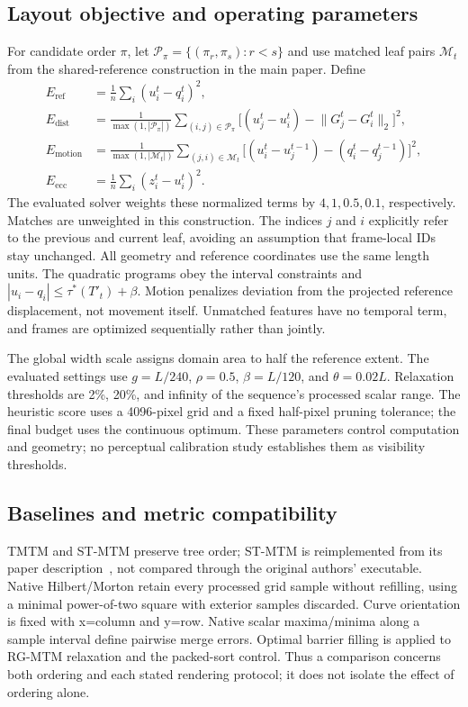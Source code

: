\subsection{Layout objective and operating parameters}
For candidate order $\pi$, let $\mathcal P_\pi=\{(\pi_r,\pi_s):r<s\}$ and use matched leaf pairs $\mathcal M_t$ from the shared-reference construction in the main paper. Define
\begin{equation}
\begin{aligned}
E_{\mathrm{ref}}&=\frac1n\sum_i(u_i^t-q_i^t)^2,\\
E_{\mathrm{dist}}&=\frac1{\max(1,|\mathcal P_\pi|)}
 \sum_{(i,j)\in\mathcal P_\pi}\bigl[(u_j^t-u_i^t)-\lVert G_j^t-G_i^t\rVert_2\bigr]^2,\\
E_{\mathrm{motion}}&=\frac1{\max(1,|\mathcal M_t|)}
 \sum_{(j,i)\in\mathcal M_t}\bigl[(u_i^t-u_j^{t-1})-(q_i^t-q_j^{t-1})\bigr]^2,\\
E_{\mathrm{ecc}}&=\frac1n\sum_i(z_i^t-u_i^t)^2.
\end{aligned}
\end{equation}
The evaluated solver weights these normalized terms by $4,1,0.5,0.1$, respectively. Matches are unweighted in this construction. The indices $j$ and $i$ explicitly refer to the previous and current leaf, avoiding an assumption that frame-local IDs stay unchanged. All geometry and reference coordinates use the same length units. The quadratic programs obey the interval constraints and $|u_i-q_i|\le\tau^*(T'_t)+\beta$. Motion penalizes deviation from the projected reference displacement, not movement itself. Unmatched features have no temporal term, and frames are optimized sequentially rather than jointly.

The global width scale assigns domain area to half the reference extent. The evaluated settings use $g=L/240$, $\rho=0.5$, $\beta=L/120$, and $\theta=0.02L$. Relaxation thresholds are 2\%, 20\%, and infinity of the sequence's processed scalar range. The heuristic score uses a 4096-pixel grid and a fixed half-pixel pruning tolerance; the final budget uses the continuous optimum. These parameters control computation and geometry; no perceptual calibration study establishes them as visibility thresholds.

\subsection{Baselines and metric compatibility}
TMTM and ST-MTM preserve tree order; ST-MTM is reimplemented from its paper description~\cite{STMTM:2026}, not compared through the original authors' executable. Native Hilbert/Morton retain every processed grid sample without refilling, using a minimal power-of-two square with exterior samples discarded. Curve orientation is fixed with x=column and y=row. Native scalar maxima/minima along a sample interval define pairwise merge errors. Optimal barrier filling is applied to RG-MTM relaxation and the packed-sort control. Thus a comparison concerns both ordering and each stated rendering protocol; it does not isolate the effect of ordering alone.


